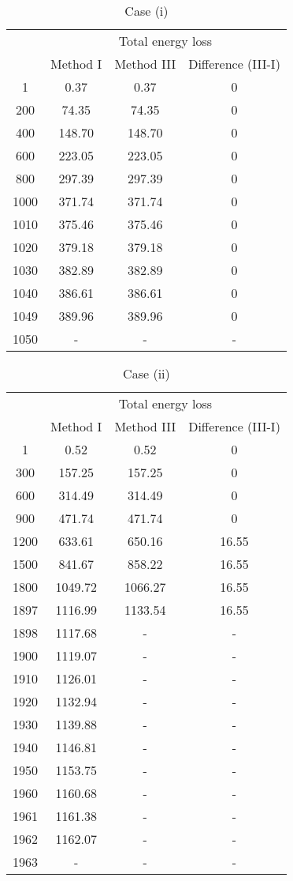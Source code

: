 \documentclass[journal]{IEEEtran}
\begin{document}
\begin{table}[!t]
\renewcommand{\arraystretch}{1.3}
\caption{Case {(i)}}
\label{case1}
\centering
\begin{tabular}{c|c|c|c}
\hline\hline
\multirow{2}{*}{}& \multicolumn{3}{c}{Total energy loss}\\ \cline{2-4}
 & Method I  & Method III & Difference (III-I)\\
\hline
1		&0.37			&0.37		&0\\
200	&74.35		&74.35	&0\\
400	&148.70		&148.70	&0\\
600	&223.05		&223.05	&0\\
800	&297.39		&297.39	&0\\
1000&	371.74	&371.74	&0\\
1010&	375.46	&375.46	&0\\
1020&	379.18	&379.18	&0\\
1030&	382.89	&382.89	&0\\
1040&	386.61	&386.61	&0\\
1049&	389.96	&389.96	&0\\
1050&	-				&	-			&	-\\
\hline\hline
\end{tabular}
\end{table}

\begin{table}[!t]
\renewcommand{\arraystretch}{1.3}
\caption{Case {(ii)}}
\label{case2}
\centering
\begin{tabular}{c|c|c|c}
\hline\hline
\multirow{2}{*}{}& \multicolumn{3}{c}{Total energy loss}\\ \cline{2-4}
 & Method I  & Method III & Difference (III-I)\\
\hline
1	&	0.52		&	0.52		&0\\
300	&	157.25	&	157.25	&0\\
600	&	314.49	&	314.49	&0\\
900	&	471.74	&	471.74	&0\\
1200&	633.61	&	650.16	&16.55\\
1500&	841.67	&	858.22	&16.55\\
1800&	1049.72	&	1066.27	&16.55\\
1897&	1116.99	&	1133.54	&16.55\\
1898&	1117.68	&	-		&-\\
1900&	1119.07	&	-		&-\\
1910&	1126.01	&	-		&-\\
1920&	1132.94	&	-		&-\\
1930&	1139.88	&	-		&-\\
1940&	1146.81	&	-		&-\\
1950&	1153.75	&	-		&-\\
1960&	1160.68	&	-		&-\\
1961&	1161.38	&	-		&-\\
1962&	1162.07	&	-		&-\\
1963&	-		&	-		&-\\
\hline\hline
\end{tabular}
\end{table}
\end{document}
